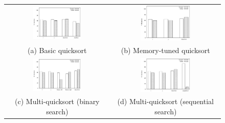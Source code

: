 \documentclass[acmtocl]{acmtrans2m}
\begin{document}
\begin{figure}
\centering
\begin{tabular}{cc}
\includegraphics[width=0.48\textwidth]{plots/counter_base_quicksort__median_of_3__0.eps} & \includegraphics[width=0.48\textwidth]{plots/counter_memory_tuned_quicksort_0.eps} \\
(a) Basic quicksort & (b) Memory-tuned quicksort \\ 
\includegraphics[width=0.48\textwidth]{plots/counter_multi_quicksort__binary_search__0.eps} & \includegraphics[width=0.48\textwidth]{plots/counter_multi_quicksort__sequential_search__0.eps} \\
(c) Multi-quicksort (binary search) & (d) Multi-quicksort (sequential search)
\end{tabular}

\end{figure}
\end{document}
